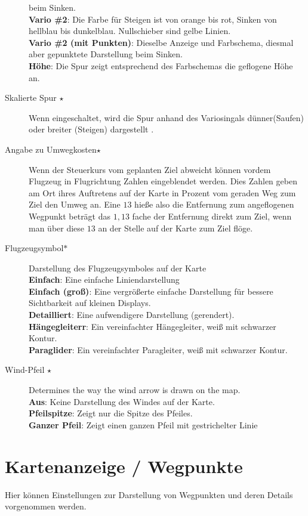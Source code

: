 \begin{description}
beim Sinken. \\
  {\bf Vario \#2}: Die Farbe für Steigen ist von orange bis rot, Sinken von hellblau bis dunkelblau. Nullschieber sind gelbe Linien.\\
  {\bf Vario \#2 (mit Punkten)}: Dieselbe Anzeige und Farbschema, diesmal aber gepunktete Darstellung
  beim Sinken.\\
  {\bf Höhe}: Die Spur zeigt entsprechend des Farbschemas die geflogene Höhe an.
\item[Skalierte Spur $\star$] \label{conf:trailscaled} Wenn eingeschaltet, wird die Spur anhand des Variosingals
dünner(Saufen) oder breiter (Steigen) dargestellt .
\item[Angabe zu Umwegkosten$\star$]  Wenn der Steuerkurs vom geplanten Ziel abweicht können vordem
Flugzeug in Flugrichtung Zahlen eingeblendet werden. Dies Zahlen geben am Ort ihres Auftretens auf der Karte
in Prozent vom geraden Weg zum Ziel den Umweg an. Eine $13$ hieße also die Entfernung zum angeflogenen
Wegpunkt beträgt das $1,13$ fache der Entfernung direkt zum Ziel, wenn man über diese $13$
an der Stelle auf der Karte zum Ziel flöge.
\item[Flugzeugsymbol$\ast$]  Darstellung des Flugzeugsymboles auf der Karte \\
  {\bf Einfach}: Eine einfache Liniendarstellung \\
  {\bf Einfach (groß)}: Eine vergrößerte einfache Darstellung für bessere Sichtbarkeit auf kleinen Displays. \\
  {\bf Detailliert}: Eine aufwendigere Darstellung (gerendert). \\
  {\bf Hängegleiterr}: Ein vereinfachter Hängegleiter, weiß mit schwarzer Kontur. \\
  {\bf Paraglider}: Ein vereinfachter Paragleiter, weiß mit schwarzer Kontur.
\item[Wind-Pfeil $\star$]  Determines the way the wind arrow is drawn on the map. \\
  {\bf Aus}: Keine Darstellung des Windes auf der Karte. \\
  {\bf Pfeilspitze}: Zeigt  nur die Spitze des Pfeiles. \\
  {\bf Ganzer Pfeil}: Zeigt einen ganzen Pfeil mit gestrichelter Linie
\end{description}
\section{Kartenanzeige / Wegpunkte}\label{sec:waypoint-display}
Hier können Einstellungen zur Darstellung von Wegpunkten und deren Details
vorgenommen werden.

